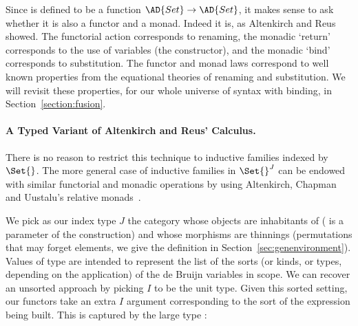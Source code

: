 Since  is defined to be a function $\AD{Set} \to \AD{Set}$, it
makes sense to ask whether it is also a functor and a monad. Indeed it
is, as Altenkirch and Reus showed. The functorial action corresponds
to renaming, the monadic `return' corresponds to the use of variables
(the  constructor), and the monadic `bind' corresponds
to substitution. The functor and monad laws correspond to well known
properties from the equational theories of renaming and
substitution. We will revisit these properties, for our whole universe
of syntax with binding, in Section~\ref{section:fusion}.

\paragraph{A Typed Variant of Altenkirch and Reus' Calculus.}
\label{section:mech-reus}

There is no reason to restrict this technique to inductive families
indexed by $\Set{}$. The more general case of inductive families in
$\Set{}^J$ can be endowed with similar functorial and monadic
operations by using Altenkirch, Chapman and Uustalu's relative
monads~\citeyear{Altenkirch2010, JFR4389}.

We pick as our index type $J$ the category whose objects are
inhabitants of   ( is a parameter of the
construction) and whose morphisms are thinnings (permutations that may
forget elements, we give the definition in Section~\ref{sec:genenvironment}).  Values of type
  are intended to represent the list of the sorts (or
kinds, or types, depending on the application) of the de Bruijn
variables in scope. We can recover an unsorted approach by picking $I$
to be the unit type.  Given this sorted setting, our functors take an
extra $I$ argument corresponding to the sort of the expression being
built. This is captured by the large type 
:%

